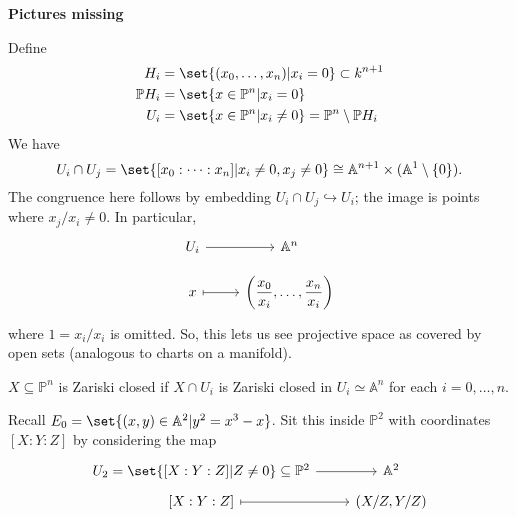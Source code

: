 \documentclass{article}
\newcommand{\A}{\mathbb{A}}
\newcommand{\proj}{\mathbb{P}}
\begin{document}



\textbf{Pictures missing}

Define
\begin{align*}
    H_i       &= \set{(x_0, \dotsc, x_n) | x_i = 0} \subset k^{n+1} \\
    \proj H_i &= \set{ x\in \proj^n | x_i = 0} \\
    U_i       &= \set{x \in \proj^n | x_i \neq 0} = \proj^n \setminus \proj H_i
\end{align*}
We have
\begin{equation*}U_i \cap U_j = \set{[x_0:\dotsm:x_n] | x_i \neq 0, x_j \neq 0} \cong \A^{n+1} \times (\A^1 \setminus \{0\}).\end{equation*}
The congruence here follows by embedding $U_i \cap U_j \hookrightarrow U_i$; the image is points where $x_j/x_i \neq 0$.
In particular,
\begin{equation*}
    \begin{tikzcd}[row sep=small]
        U_i \rar["~"] & \A^n \\
        x \rar[mapsto] & \left(\dfrac{x_0}{x_i}, \dotsc, \dfrac{x_n}{x_i}\right)
    \end{tikzcd}
\end{equation*}
where $1=x_i/x_i$ is omitted.
So, this lets us see projective space as covered by open sets (analogous to charts on a manifold).
\begin{defi}
    $X \subseteq \proj^n$ is Zariski closed if $X \cap U_i$ is Zariski closed in $U_i\simeq \A^n$ for each $i=0, \dotsc, n$.
\end{defi}
Recall $E_0 = \set{(x, y) \in \A^2 | y^2 = x^3 - x}$. Sit this inside $\proj^2$ with coordinates $[X:Y:Z]$ by considering the map
\begin{equation*}
    \begin{tikzcd}[row sep=tiny]
        U_2 = \set{[X:Y:Z] | Z \neq 0} \subseteq \proj^2 \rar["~"] & \A^2 \\
        {[X:Y:Z]} \rar[mapsto] & (X/Z, Y/Z)
    \end{tikzcd}
\end{equation*}
\end{document}
